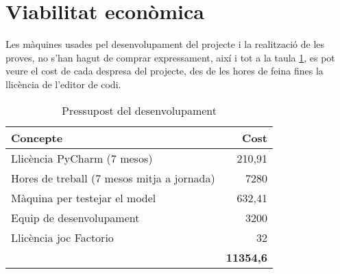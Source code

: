 \section{Viabilitat econòmica}
Les màquines usades pel desenvolupament del projecte i la realització de les proves, no s'han hagut de comprar expressament, així i tot a la taula \ref{tab:pressupost}, es pot veure el cost de cada despresa del projecte, des de les hores de feina fines la llicència de l'editor de codi.

\begin{table}[H]
    \centering
    \begin{tabular}{|l|r|}
        \hline
        \textbf{Concepte} & \textbf{Cost} \\ \hline
        Llicència PyCharm (7 mesos) & 210,91\\ \hline
        Hores de treball (7 mesos mitja a jornada) & 7280\\ \hline
        Màquina per testejar el model & 632,41\\ \hline
        Equip de desenvolupament & 3200\\ \hline
        Llicència joc Factorio & 32\\ \hline
        \multicolumn{1}{l|}{} & \multicolumn{1}{c|}{\textbf{11354,6}} \\ \cline{2-2}
    \end{tabular}
    \caption{Pressupost del desenvolupament}
    \label{tab:pressupost}
\end{table}




